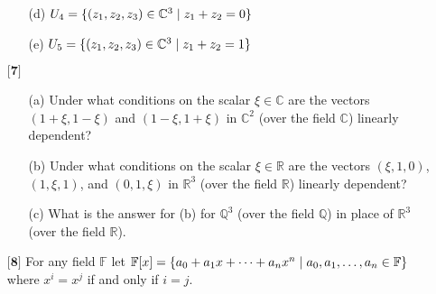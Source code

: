 \documentclass[12pt]{article}
\begin{document}
\begin{itemize}
\begin{itemize}
    \vspace{.3cm}
    \item[(d)]
    $U_4 = \{ (z_1,z_2,z_3) \in \mathbb{C}^3 \hspace{.1cm} | \hspace{.1cm} z_1 + z_2 = 0 \}$
    
    \vspace{.3cm}
    \item[(e)]
    $U_5 = \{ (z_1,z_2,z_3) \in \mathbb{C}^3 \hspace{.1cm} | \hspace{.1cm} z_1 + z_2 = 1 \}$
    
    \end{itemize}
    
    \vspace{.5cm}
    
    \item[$\textbf{[7]}$]
    \begin{itemize}
    
    \item[(a)]
    Under what conditions on the scalar $\xi \in \mathbb{C}$ are the vectors $(1 + \xi, 1 - \xi)$ and $(1 - \xi, 1 + \xi)$ in $\mathbb{C}^2$ (over the field $\mathbb{C}$) linearly dependent?
    
    \vspace{.3cm}
    \item[(b)]
    Under what conditions on the scalar $\xi \in \mathbb{R}$ are the vectors $(\xi,1,0)$, $(1,\xi,1)$, and $(0,1,\xi)$ in $\mathbb{R}^3$ (over the field $\mathbb{R}$) linearly dependent?
    
    \vspace{.3cm}
    \item[(c)]
    What is the answer for (b) for $\mathbb{Q}^3$ (over the field $\mathbb{Q}$) in place of $\mathbb{R}^3$ (over the field $\mathbb{R}$). 
    
    \end{itemize}
    
    \vspace{.5cm}
    
    \item[$\textbf{[8]}$]
    For any field $\mathbb{F}$ let $\mathbb{F}[x] = \{ a_0 + a_1x + \dots + a_nx^n \hspace{.1cm} | \hspace{.1cm} a_0,a_1,\dots,a_n \in \mathbb{F} \}$ where $x^i = x^j$ if and only if $i = j$. 
    \begin{itemize}
    

\end{itemize}
\end{itemize}
\end{document}
